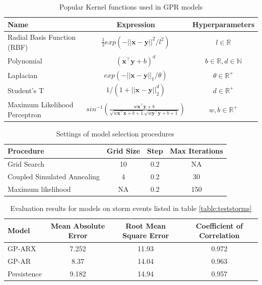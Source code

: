 \documentclass[sw, draft]{AGUTeX}
\begin{document}
\begin{table}[h]
\caption{Popular Kernel functions used in GPR models}
\centering
\begin{tabular}{l c c}
\hline
 Name  & Expression & Hyperparameters  \\
\hline
  Radial Basis Function (RBF)  & $\frac{1}{2} exp(-||\mathbf{x} - \mathbf{y}||^2/l^2)$  & $l \in \mathbb{R}$   \\

  Polynomial  & $(\mathbf{x}^\intercal \mathbf{y} + b)^d$ & $b \in \mathbb{R}, d \in \mathbb{N}$   \\

  Laplacian  & $exp(-||\mathbf{x} - \mathbf{y}||_{1}/\theta)$  & $\theta \in \mathbb{R}^+$  \\

  Student's T  & $1/(1 + ||\mathbf{x} - \mathbf{y}||_{2}^d)$ & $d \in \mathbb{R}^{+}$\\

  Maximum Likelihood Perceptron  & $sin^{-1}(\frac{w\mathbf{x}^\intercal \mathbf{y} + b}{\sqrt{w\mathbf{x}^\intercal \mathbf{x} + b + 1} \sqrt{w\mathbf{y}^\intercal \mathbf{y} + b + 1}})$ & $w, b \in \mathbb{R}^{+}$\\
\hline
\end{tabular}
\label{table:kernel}
\end{table}

\begin{table}[h]
\centering
\caption{Settings of model selection procedures}
\begin{tabular}{l c c c}
\hline
Procedure & Grid Size & Step & Max Iterations \\
\hline
Grid Search & 10 & 0.2 & NA \\
Coupled Simulated Annealing & 4 & 0.2 & 30 \\
Maximum likelihood & NA & 0.2 & 150\\
\end{tabular}
\label{table:modelselection}
\end{table}


\begin{table}[h]
\centering
\caption{Evaluation results for models on storm events listed in table \ref{table:teststorms}}
\label{table:results}
\begin{tabular}{l c c c}
\hline
Model & Mean Absolute Error & Root Mean Square Error & Coefficient of Correlation\\ \hline
GP-ARX & 7.252 & 11.93 & 0.972\\
GP-AR & 8.37 & 14.04 & 0.963\\
Persistence & 9.182 & 14.94 & 0.957\\
\end{tabular}
\end{table}
\end{document}
